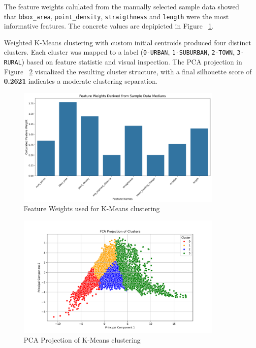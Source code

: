 \documentclass[a4paper,12pt,twoside]{scrreprt}
\begin{document}
The feature weights calulated from the manually selected sample data showed
that \texttt{bbox\_area}, \texttt{point\_density},
\texttt{straigthness} and \texttt{length} were the most informative features.
The concrete values are depipicted
in Figure ~\ref{fig:feature_weights_for_kmeans}.

Weighted K-Means clustering with custom initial centroids produced four
distinct clusters. Each cluster was mapped to a label (\texttt{0-URBAN},
\texttt{1-SUBURBAN}, \texttt{2-TOWN}, \texttt{3-RURAL}) based on feature
statistic and visual inspection.
The PCA projection in Figure ~\ref{fig:pca_kmeans} visualized the resulting
cluster structure, with a final silhouette score of \textbf{0.2621} indicates a
moderate clustering
separation.

\begin{figure}[htbp]
  \centering

  \includegraphics[width=0.9\textwidth]{Figures/feature_weights.png}
  \caption{Feature Weights used for K-Means clustering}
  \label{fig:feature_weights_for_kmeans}
\end{figure}

\begin{figure}[htbp]
  \centering

  \includegraphics[width=0.9\textwidth]{Figures/kmeans_diagram_feature_data.png}
  \caption{PCA Projection of K-Means clustering}
  \label{fig:pca_kmeans}
\end{figure}
\FloatBarrier
\end{document}
